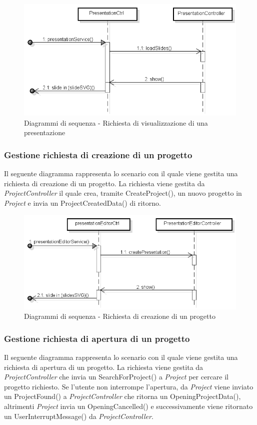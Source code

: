 \begin{figure}[h]
	\centering
	\includegraphics[scale=0.5]{img/view.png}
	\caption{Diagrammi di sequenza - Richiesta di visualizzazione di una presentazione}
\end{figure} 


\subsubsection{Gestione richiesta di creazione di un progetto}
Il seguente diagramma rappresenta lo scenario con il quale viene gestita una richiesta di creazione di un progetto. La richiesta viene gestita da \textit{ProjectController} il quale crea, tramite CreateProject(), un nuovo progetto in \textit{Project} e invia un ProjectCreatedData() di ritorno.

\begin{figure}[h]
	\centering
	\includegraphics[scale=0.5]{img/create.png}
	\caption{Diagrammi di sequenza - Richiesta di creazione di un progetto}
\end{figure}

\subsubsection{Gestione richiesta di apertura di un progetto}
Il seguente diagramma rappresenta lo scenario con il quale viene gestita una richiesta di apertura di un progetto. La richiesta viene gestita da \textit{ProjectController} che invia un SearchForProject() a \textit{Project} per cercare il progetto richiesto. Se l'utente non interrompe l'apertura, da \textit{Project} viene inviato un ProjectFound() a \textit{ProjectController} che ritorna un OpeningProjectData(), altrimenti \textit{Project} invia un OpeningCancelled() e successivamente viene ritornato un UserInterruptMessage() da \textit{ProjectController}.

